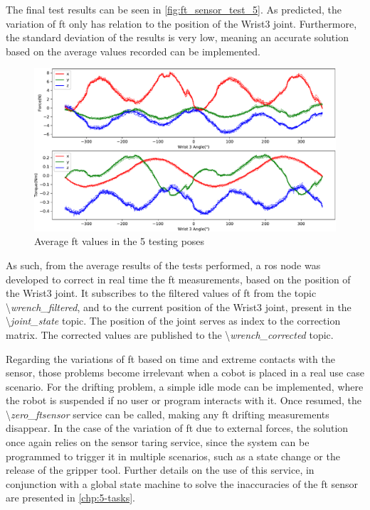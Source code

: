 
\par The final test results can be seen in \autoref{fig:ft_sensor_test_5}. As predicted, the variation of \ac{ft} only has relation to the position of the Wrist3 joint. Furthermore, the standard deviation of the results is very low, meaning an accurate solution based on the average values recorded can be implemented.

\begin{figure}[h]
    \centering
    \includegraphics[width=0.8\linewidth]{figs/chp3/ft_sensor_test_5.pdf}
    \caption{Average \ac{ft} values in the 5 testing poses}
    \label{fig:ft_sensor_test_5}
\end{figure}

\par As such, from the average results of the tests performed, a \ac{ros} node was developed to correct in real time the \ac{ft} measurements, based on the position of the Wrist3 joint. It subscribes to the filtered values of \ac{ft} from the topic \textbackslash \textit{wrench\_filtered}, and to the current position of the Wrist3 joint, present in the \textbackslash \textit{joint\_state} topic. The position of the joint serves as index to the correction matrix. The corrected values are published to the \textbackslash \textit{wrench\_corrected} topic.

\par Regarding the variations of \ac{ft} based on time and extreme contacts with the sensor, those problems become irrelevant when a cobot is placed in a real use case scenario. For the drifting problem, a simple idle mode can be implemented, where the robot is suspended if no user or program interacts with it. Once resumed, the \textbackslash\textit{zero\_ftsensor} service can be called, making any \ac{ft} drifting measurements disappear. In the case of the variation of \ac{ft} due to external forces, the solution once again relies on the sensor taring service, since the system can be programmed to trigger it in multiple scenarios, such as a state change or the release of the gripper tool. Further details on the use of this service, in conjunction with a global state machine to solve the inaccuracies of the \ac{ft} sensor are presented in \autoref{chp:5-tasks}.

